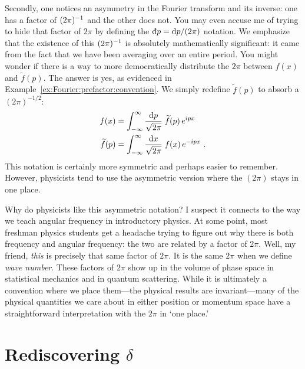 \documentclass[12pt, oneside]{report}    %
\let\oldsection\section
\def\section{%
  \setcounter{sidenote}{1}%
  \oldsection
}
\begin{document}
Secondly, one notices an asymmetry in the Fourier transform and its inverse: one has a factor of $(2\pi)^{-1}$ and the other does not. You may even accuse me of trying to hide that factor of $2\pi$ by defining the $\Dbar{p}=\D{p}/(2\pi)$ notation. We emphasize that the existence of this $(2\pi)^{-1}$ is absolutely mathematically significant: it came from the fact that we have been averaging over an entire period. You might wonder if there is a way to more democratically distribute the $2\pi$ between $f(x)$ and $\tilde f(p)$. The answer is yes, as evidenced in Example~\ref{ex:Fourier:prefactor:convention}. We simply redefine $\tilde f(p)$ to absorb a $(2\pi)^{-1/2}$:
\begin{align}
    f(x) &= 
    \int_{-\infty}^\infty \frac{\operatorname{d}\!{p}}{\sqrt{2\pi}}\; 
    \widetilde f(p)\,
    e^{ipx} 
    \label{eq:fourier:transform:convention:even:pi}
\\
    \widetilde f(p) &= 
    \int_{-\infty}^\infty \frac{\operatorname{d}\!{x}}{\sqrt{2\pi}}\; 
    f(x)\, e^{-ipx} 
    \ .
    \label{eq:fourier:inverse:transform:convention:even:pi}
\end{align}
This notation is certainly more symmetric and perhaps easier to remember. However, physicists tend to use the asymmetric version where the $(2\pi)$ stays in one place.
\begin{example}
Why do physicists like this asymmetric notation? I suspect it connects to the way we teach angular frequency in introductory physics. At some point, most freshman physics students get a headache trying to figure out why there is both frequency and angular frequency: the two are related by a factor of $2\pi$. Well, my friend, \emph{this} is precisely that same factor of $2\pi$. It is the same $2\pi$ when we define \emph{wave number}. These factors of $2\pi$ show up in the volume of phase space in statistical mechanics and in quantum scattering. While it is ultimately a convention where we place them---the physical results are invariant---many of the physical quantities we care about in either position or momentum space have a straightforward interpretation with the $2\pi$ in `one place.'
\end{example}

\section{\texorpdfstring{Rediscovering $\delta$}{Rediscovering delta}}
\end{document}
